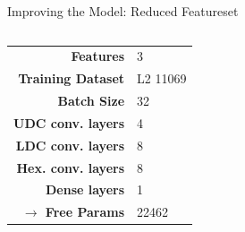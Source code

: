 \begin{frame}{Improving the Model: Reduced Featureset}
    \begin{columns}
        \begin{column}{.35\textwidth}
            \begin{tabular}{>{\small\bf}r l}
                \toprule
                Features                  & 3         \\
                Training Dataset          & L2 11069  \\
                Batch Size                & 32        \\
                UDC conv. layers          & 4         \\
                LDC conv. layers          & 8         \\
                Hex. conv. layers         & 8         \\
                Dense layers              & 1\times50 \\
                $\rightarrow$ Free Params & 22462     \\
                \bottomrule
            \end{tabular}
        \end{column}
        \begin{column}{.65\textwidth}
\end{column}
\end{columns}
\end{frame}
